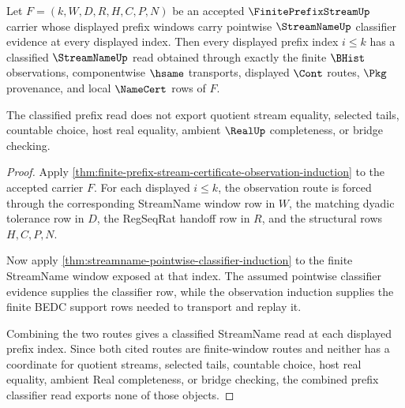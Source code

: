 \begin{theorem}
\label{thm:streamname-finite-prefix-pointwise-classifier-induction}
Let $F=(k,W,D,R,H,C,P,N)$ be an accepted $\FinitePrefixStreamUp$ carrier whose displayed prefix windows carry pointwise $\StreamNameUp$ classifier evidence at every displayed index. Then every displayed prefix index $i \leq k$ has a classified $\StreamNameUp$ read obtained through exactly the finite $\BHist$ observations, componentwise $\hsame$ transports, displayed $\Cont$ routes, $\Pkg$ provenance, and local $\NameCert$ rows of $F$.

The classified prefix read does not export quotient stream equality, selected tails, countable choice, host real equality, ambient $\RealUp$ completeness, or bridge checking.
\end{theorem}
\begin{proof}
Apply \autoref{thm:finite-prefix-stream-certificate-observation-induction} to the accepted carrier $F$. For each displayed $i \leq k$, the observation route is forced through the corresponding StreamName window row in $W$, the matching dyadic tolerance row in $D$, the RegSeqRat handoff row in $R$, and the structural rows $H,C,P,N$.

Now apply \autoref{thm:streamname-pointwise-classifier-induction} to the finite StreamName window exposed at that index. The assumed pointwise classifier evidence supplies the classifier row, while the observation induction supplies the finite BEDC support rows needed to transport and replay it.

Combining the two routes gives a classified StreamName read at each displayed prefix index. Since both cited routes are finite-window routes and neither has a coordinate for quotient streams, selected tails, countable choice, host real equality, ambient Real completeness, or bridge checking, the combined prefix classifier read exports none of those objects.
\end{proof}
